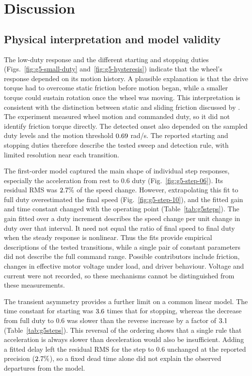 
\section{Discussion}
\label{sec:discussion}

\subsection{Physical interpretation and model validity}
The low-duty response and the different starting and stopping duties
(Figs.~\ref{fig:g5-small-duty} and~\ref{fig:g5-hysteresis}) indicate that
the wheel's response depended on its motion history. A plausible explanation
is that the drive torque had to overcome static friction before motion
began, while a smaller torque could sustain rotation once the wheel was
moving. This interpretation is consistent with the distinction between
static and sliding friction discussed by
\textcite{armstronghelouvry1994SurveyModelsAnalysis}. The experiment measured
wheel motion and commanded duty, so it did not identify friction torque
directly. The detected onset also depended on the sampled duty levels and
the motion threshold $0.69$ rad/s. The reported starting and stopping
duties therefore describe the tested sweep and detection rule, with limited
resolution near each transition.

The first-order model captured the main shape of individual step responses,
especially the acceleration from rest to 0.6 duty
(Fig.~\ref{fig:g5-step-06}). Its residual RMS was $2.7\%$ of the
speed change. However, extrapolating this fit to full duty overestimated
the final speed (Fig.~\ref{fig:g5-step-10}), and the fitted gain and time
constant changed with the operating point (Table~\ref{tab:g5steps}).
The gain fitted over a duty increment describes the speed change per unit
change in duty over that interval. It need not equal the ratio of final
speed to final duty when the steady response is nonlinear. Thus the fits
provide empirical descriptions of the tested transitions, while a single
pair of constant parameters did not describe the full command range.
Possible contributors include friction, changes in effective motor voltage
under load, and driver behaviour. Voltage and current were not recorded,
so these mechanisms cannot be distinguished from these measurements.

The transient asymmetry provides a further limit on a common linear model.
The time constant for starting was $3.6$ times that for
stopping, whereas the decrease from full duty to 0.6 was slower than the
reverse increase by a factor of $3.1$
(Table~\ref{tab:g5steps}). This reversal of the ordering shows that a
single rule that acceleration is always slower than deceleration would
also be insufficient. Adding a fitted delay left the residual RMS for the
step to 0.6 unchanged at the reported precision
($2.7\%$), so a fixed dead time alone did not explain the observed
departures from the model.

